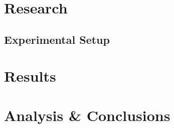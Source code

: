 \documentclass{uvamscse}	%
\begin{document}

\chapter{Research}

\section{Experimental Setup}

\chapter{Results}

\chapter{Analysis \& Conclusions}





\newpage

\end{document}

